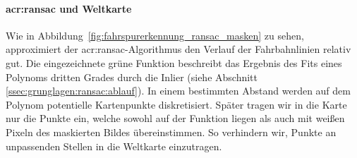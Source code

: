 
\paragraph{\gls{acr:ransac} und Weltkarte} 
Wie in Abbildung~\ref{fig:fahrspurerkennung_ransac_masken} zu sehen, approximiert der \gls{acr:ransac}-Algorithmus den Verlauf der Fahrbahnlinien relativ gut. Die eingezeichnete grüne Funktion beschreibt das Ergebnis des Fits eines Polynoms dritten Grades durch die Inlier (siehe Abschnitt \ref{ssec:grunglagen:ransac:ablauf}). In einem bestimmten Abstand werden auf dem Polynom potentielle Kartenpunkte diskretisiert. Später tragen wir in die Karte nur die Punkte ein, welche sowohl auf der Funktion liegen als auch mit weißen Pixeln des maskierten Bildes übereinstimmen. So verhindern wir, Punkte an unpassenden Stellen in die Weltkarte einzutragen. 